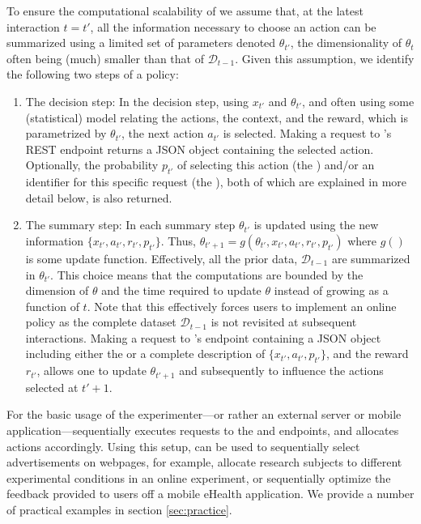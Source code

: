 \documentclass[nojss]{jss}
\begin{document}
To ensure the computational scalability of  we assume that, at the latest interaction $t=t'$, all the information necessary to choose an action can be summarized using a limited set of parameters denoted $\theta_{t'}$, the dimensionality of $\theta_t$ often being (much) smaller than that of $\mathcal{D}_{t-1}$. Given this assumption, we identify the following two steps of a policy:
\begin{enumerate}
\item The decision step: In the decision step, using $x_{t'}$ and $\theta_{t'}$, and often using some (statistical) model relating the actions, the context, and the reward, which is parametrized by $\theta_{t'}$, the next action $a_{t'}$ is selected. Making a request to 's  REST endpoint returns a JSON object containing the selected action. Optionally, the probability $p_{t'}$ of selecting this action (the ) and/or an identifier for this specific request (the ), both of which are explained in more detail below, is also returned.
\item The summary step: In each summary step $\theta_{t'}$ is updated using the new information $\{x_{t'},a_{t'},r_{t'}, p_{t'}\}$. Thus, $\theta_{t'+1} = g(\theta_{t'}, x_{t'},a_{t'},r_{t'}, p_{t'})$ where $g()$ is some update function. Effectively, all the prior data, $\mathcal{D}_{t-1}$ are summarized in $\theta_{t'}$. This choice means that the computations are bounded by the dimension of $\theta$ and the time required to update $\theta$ instead of growing as a function of $t$. Note that this effectively forces users to implement an online policy \citep{Michalak2012} as the complete dataset $\mathcal{D}_{t-1}$ is not revisited at subsequent interactions. Making a request to 's  endpoint containing a JSON object including either the  or a complete description of $\{x_{t'},a_{t'}, p_{t'}\}$, and the reward $r_{t'}$, allows one to update $\theta_{t'+1}$ and subsequently to influence the actions selected at $t'+1$.
\end{enumerate} 

For the basic usage of  the experimenter---or rather an external server or mobile application---sequentially executes requests to the  and  endpoints, and allocates actions accordingly. Using this setup,  can be used to sequentially select advertisements on webpages, for example, allocate research subjects to different experimental conditions in an online experiment, or sequentially optimize the feedback provided to users off a mobile eHealth application. We provide a number of practical examples in section \ref{sec:practice}.
\end{document}
